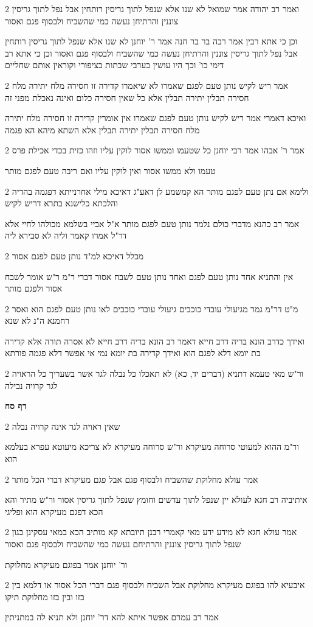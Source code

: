 \documentclass[12pt, openany]{book}
\newcommand{\sethebfont}{
\fontsize{10.5pt}{21.0pt} \selectfont
}
\newcommand{\twocol}[1]{
	{\sethebfont \begin{multicols}{2}
			#1
	\end{multicols}}	
}
\newcommand{\sectname}{}
\newcommand{\newsection}[1]{
	\addcontentsline{toc}{section}{#1}
	\renewcommand{\sectname}{#1}	
	\vspace{-\baselineskip}
	\begin{center}
		\textbf{%
\fontsize{16pt}{16pt}\selectfont
			#1}
	\end{center}
	\vspace{-\baselineskip}
	\nopagebreak
}
\begin{document}
\twocol{ואמר רב יהודה אמר שמואל לא שנו אלא שנפל לתוך גריסין רותחין אבל נפל לתוך גריסין צוננין והרתיחן נעשה כמי שהשביח ולבסוף פגם ואסור
\par וכן כי אתא רבין אמר רבה בר בר חנה אמר ר' יוחנן לא שנו אלא שנפל לתוך גריסין רותחין אבל נפל לתוך גריסין צוננין והרתיחן נעשה כמי שהשביח ולבסוף פגם ואסור וכן כי אתא רב דימי כו' וכך היו עושין בערבי שבתות בציפורי וקוראין אותם שחליים}
\twocol{אמר ריש לקיש נותן טעם לפגם שאמרו לא שיאמרו קדירה זו חסירה מלח יתירה מלח חסירה תבלין יתירה תבלין אלא כל שאין חסירה כלום ואינה נאכלת מפני זה
\par ואיכא דאמרי אמר ריש לקיש נותן טעם לפגם שאמרו אין אומרין קדירה זו חסירה מלח יתירה מלח חסירה תבלין יתירה תבלין אלא השתא מיהא הא פגמה}
\twocol{אמר ר' אבהו אמר רבי יוחנן כל שטעמו וממשו אסור לוקין עליו וזהו כזית בכדי אכילת פרס
\par טעמו ולא ממשו אסור ואין לוקין עליו ואם ריבה טעם לפגם מותר}
\twocol{ולימא אם נתן טעם לפגם מותר הא קמשמע לן דאע"ג דאיכא מילי אחרנייתא דפגמה בהדיה והלכתא כלישנא בתרא דריש לקיש
\par אמר רב כהנא מדברי כולם נלמד נותן טעם לפגם מותר א"ל אביי בשלמא מכולהו לחיי אלא דר"ל אמרו קאמר וליה לא סבירא ליה}
\twocol{מכלל דאיכא למ"ד נותן טעם לפגם אסור
\par אין והתניא אחד נותן טעם לפגם ואחד נותן טעם לשבח אסור דברי ר"מ ר"ש אומר לשבח אסור ולפגם מותר}
\twocol{מ"ט דר"מ גמר מגיעולי עובדי כוכבים גיעולי עובדי כוכבים לאו נותן טעם לפגם הוא ואסר רחמנא ה"נ לא שנא
\par ואידך כדרב הונא בריה דרב חייא דאמר רב הונא בריה דרב חייא לא אסרה תורה אלא קדירה בת יומא דלא לפגם הוא ואידך קדירה בת יומא נמי אי אפשר דלא פגמה פורתא}
\twocol{ור"ש מאי טעמא דתניא (דברים יד, כא) לא תאכלו כל נבלה לגר אשר בשעריך כל הראויה לגר קרויה נבילה}
\newsection{דף סח}
\twocol{שאין ראויה לגר אינה קרויה נבלה
\par ור"מ ההוא למעוטי סרוחה מעיקרא ור"ש סרוחה מעיקרא לא צריכא מיעוטא עפרא בעלמא הוא}
\twocol{אמר עולא מחלוקת שהשביח ולבסוף פגם אבל פגם מעיקרא דברי הכל מותר
\par איתיביה רב חגא לעולא יין שנפל לתוך עדשים וחומץ שנפל לתוך גריסין אסור ור"ש מתיר והא הכא דפגם מעיקרא הוא ופליגי}
\twocol{אמר עולא חגא לא מידע ידע מאי קאמרי רבנן תיובתא קא מותיב הכא במאי עסקינן כגון שנפל לתוך גריסין צוננין והרתיחם נעשה כמי שהשביח ולבסוף פגם ואסור
\par ור' יוחנן אמר בפוגם מעיקרא מחלוקת}
\twocol{איבעיא להו בפוגם מעיקרא מחלוקת אבל השביח ולבסוף פגם דברי הכל אסור או דלמא בין בזו ובין בזו מחלוקת תיקו
\par אמר רב עמרם אפשר איתא להא דר' יוחנן ולא תניא לה במתניתין}
\end{document}
